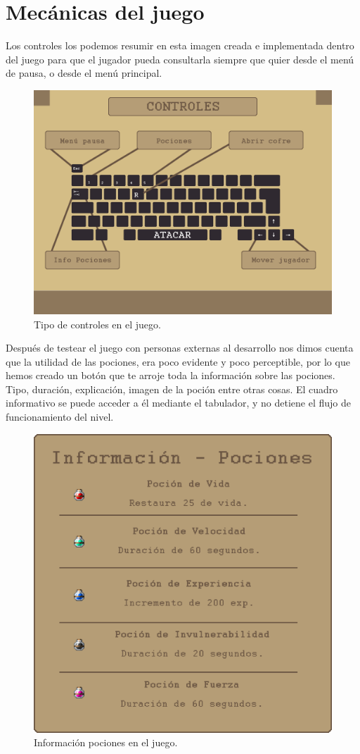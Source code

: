 \section{Mecánicas del juego}
Los controles los podemos resumir en esta imagen creada e implementada dentro del juego para que el jugador pueda consultarla siempre que quier desde el menú de pausa, o desde el menú principal.
\begin{figure}[!htb]
  \centering
    \includegraphics[width=\linewidth]{./img/controles.png}
    \caption{Tipo de controles en el juego.}
  \label{fig:yo}
\end{figure}
\newline
Después de testear el juego con personas externas al desarrollo nos dimos cuenta que la utilidad de las pociones, era poco evidente y poco perceptible, por lo que hemos creado un botón que te arroje toda la información sobre las pociones. Tipo, duración, explicación, imagen de la poción entre otras cosas. El cuadro informativo se puede acceder a él mediante el tabulador, y no detiene el flujo de funcionamiento del nivel.
\newpage
\begin{figure}[!htb]
  \centering
    \includegraphics[width=0.8\linewidth]{./img/info_poc.png}
    \caption{Información pociones en el juego.}
  \label{fig:yo}
\end{figure}
